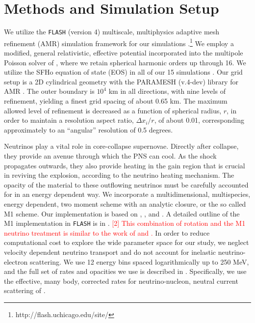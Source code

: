 \documentclass[twocolumn,times]{aastex62}  %
\begin{document}

\section{Methods and Simulation Setup}
\label{sec:method}
We utilize the \texttt{FLASH} (version 4) multiscale, multiphysics adaptive mesh refinement (AMR) simulation framework for our simulations \citep{fryxell:2000,dubey:2009}.\footnote{http://flash.uchicago.edu/site/}  We employ a modified, general relativistic, effective potential \citep{marek:2006, oconnor:2018} incorporated into the multipole Poisson solver of \citet{couch:2013a}, where we retain spherical harmonic orders up through 16.   We utilize the SFHo equation of state (EOS) in all of our 15 simulations \citep{steiner:2013}.  Our grid setup is a 2D cylindrical geometry with the PARAMESH (v.4-dev) library for AMR  \citep{macneice:2000}.  The outer boundary is $10^4$ km in all directions, with nine levels of refinement, yielding a finest grid spacing of about 0.65 km.
The maximum allowed level of refinement is decreased as a function of spherical radius, $r$, in order to maintain a resolution aspect ratio, $\Delta x_i / r$, of about 0.01, corresponding approximately to an ``angular'' resolution of 0.5 degrees.

Neutrinos play a vital role in core-collapse supernovae.  Directly after collapse, they provide an avenue through which the PNS can cool.  As the shock propagates outwards, they also provide heating in the gain region that is crucial in reviving the explosion, according to the neutrino heating mechanism.  The opacity of the material to these outflowing neutrinos must be carefully accounted for in an energy dependent way.  We incorporate a multidimensional, multispecies, energy dependent, two moment scheme with an analytic closure, or the so called M1 scheme.  Our implementation is based on \citet{oconnor:2015}, \citet{shibata:2011}, and \citet{cardall:2013}.  A detailed outline of the M1 implementation in \texttt{FLASH} is in \citet{oconnor:2018}.  \textcolor{red}{[2] This combination of rotation and the M1 neutrino treatment is similar to the work of \citet{obergaulinger:2017} and \citet{obergaulinger:2018}.}  In order to reduce computational cost to explore the wide parameter space for our study, we neglect velocity dependent neutrino transport and do not account for inelastic neutrino-electron scattering.
We use 12 energy bins spaced logarithmically up to 250 MeV, and the full set of rates and opacities we use is described in \citet{oconnor:2017a}. 
Specifically, we use the effective, many body, corrected rates
for neutrino-nucleon, neutral current scattering of \citet{horowitz:2017}.  
\end{document}
